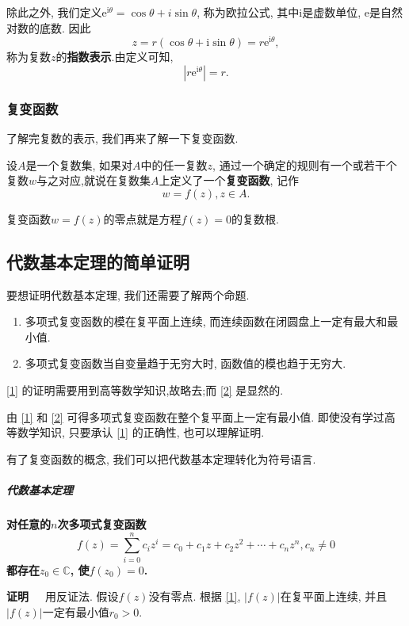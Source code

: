 \documentclass[12pt,a4paper]{ctexart}
\begin{document}
除此之外, 我们定义$\mathrm{e}^{\mathrm{i}\theta} = \cos \theta + i\sin \theta$, 称为欧拉公式,
其中$\mathrm{i}$是虚数单位, $\mathrm{e}$是自然对数的底数. 因此
$$z = r(\cos \theta + \mathrm{i}\sin \theta) = r\mathrm{e}^{\mathrm{i}\theta},$$称为复数$z$的\textbf{指数表示}.由定义可知,
$$|r\mathrm{e}^{\mathrm{i}\theta}| = r.$$

\subsubsection{复变函数}

了解完复数的表示, 我们再来了解一下复变函数.

设$A$是一个复数集, 如果对$A$中的任一复数$z$,
通过一个确定的规则有一个或若干个复数$w$与之对应,就说在复数集$A$上定义了一个\textbf{复变函数},
记作$$w = f(z), z \in A.$$

复变函数$w = f(z)$的零点就是方程$f(z) = 0$的复数根.

\subsection{代数基本定理的简单证明}

要想证明代数基本定理, 我们还需要了解两个命题.

\begin{enumerate}
    \item 多项式复变函数的模在复平面上连续, 而连续函数在闭圆盘上一定有最大和最小值.\label{1}
    \item 多项式复变函数当自变量趋于无穷大时, 函数值的模也趋于无穷大.\label{2}
\end{enumerate}

\ref{1} 的证明需要用到高等数学知识,故略去;而 \ref{2} 是显然的.

由 \ref{1} 和 \ref{2} 可得多项式复变函数在整个复平面上一定有最小值.
即使没有学过高等数学知识, 只要承认 \ref{1} 的正确性,
也可以理解证明.\newpage
\setlength{\abovedisplayskip}{3pt}
\setlength{\belowdisplayskip}{3pt}

有了复变函数的概念, 我们可以把代数基本定理转化为符号语言.

\setlength{\abovedisplayskip}{10pt}
\setlength{\belowdisplayskip}{10pt}

\subparagraph{代数基本定理} \textbf{\heiti 对任意的$n$次多项式复变函数
    $$f(z) = \sum_{i = 0}^{n} c_i z^i = c_0 + c_1z + c_2z^2 +\cdots+ c_nz^n, c_n \neq 0$$
    都存在$z_0 \in \mathbb{C}$, 使$f(z_0) = 0$.}

\textbf{证明}\ \ \  用反证法. 假设$f(z)$没有零点. 根据 \ref{1}, $|f(z)|$在复平面上连续, 并且
$|f(z)|$一定有最小值$r_0 > 0$.
\end{document}
